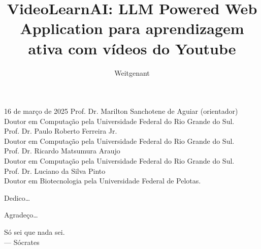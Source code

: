 \documentclass[tcc,capa]{texufpel}
\title{VideoLearnAI: LLM Powered Web Application para aprendizagem ativa com vídeos do Youtube}
\author{Weitgenant}{Kevin Castro}
\begin{document}

\maketitle 

\sloppy

\fichacatalografica


\begin{aprovacao}{16 de março de 2025} %
\noindent Prof. Dr. Marilton Sanchotene de Aguiar (orientador)\\
Doutor em Computação pela Universidade Federal do Rio Grande do Sul.\\[1cm]

\noindent Prof. Dr. Paulo Roberto Ferreira Jr.\\
Doutor em Computação pela Universidade Federal do Rio Grande do Sul.\\[1cm]

\noindent Prof. Dr. Ricardo Matsumura Araujo\\
Doutor em Computação pela Universidade Federal do Rio Grande do Sul.\\[1cm]

\noindent Prof. Dr. Luciano da Silva Pinto\\
Doutor em Biotecnologia pela Universidade Federal de Pelotas.
\end{aprovacao}

\begin{dedicatoria}
  Dedico\ldots 
\end{dedicatoria}

\begin{agradecimentos}
  Agradeço\ldots 
\end{agradecimentos}

\begin{epigrafe}
  Só sei que nada sei.\\
  {\sc --- Sócrates}
\end{epigrafe}
\end{document}
